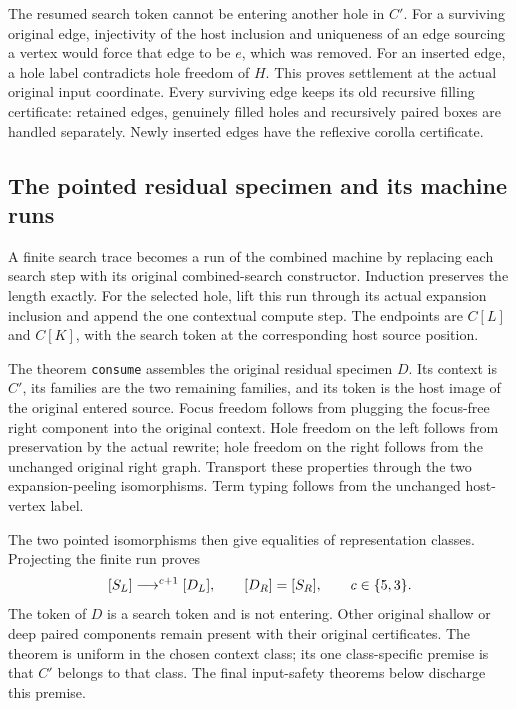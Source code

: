 
The resumed search token cannot be entering another hole in $C'$. For a
surviving original edge, injectivity of the host inclusion and uniqueness
of an edge sourcing a vertex would force that edge to be $e$, which was
removed. For an inserted edge, a hole label contradicts hole freedom of
$H$. This proves settlement at the actual original input coordinate.
Every surviving edge keeps its old recursive filling certificate: retained
edges, genuinely filled holes and recursively paired boxes are handled
separately. Newly inserted edges have the reflexive corolla certificate.


\subsection{The pointed residual specimen and its machine runs}
A finite search trace becomes a run of the combined machine by replacing
each search step with its original combined-search constructor. Induction
preserves the length exactly. For the selected hole, lift this run through
its actual expansion inclusion and append the one contextual compute step.
The endpoints are $C[L]$ and $C[K]$, with the search token at the
corresponding host source position.


The theorem \texttt{consume} assembles the original residual specimen $D$.
Its context is $C'$, its families are the two remaining families, and its
token is the host image of the original entered source. Focus freedom follows
from plugging the focus-free right component into the original context.
Hole freedom on the left follows from preservation by the actual rewrite;
hole freedom on the right follows from the unchanged original right graph.
Transport these properties through the two expansion-peeling isomorphisms.
Term typing follows from the unchanged host-vertex label.

The two pointed isomorphisms then give equalities of representation classes.
Projecting the finite run proves
\[
 [S_L]\mathrel{\longrightarrow^{c+1}}[D_L],\qquad [D_R]=[S_R],
 \qquad c\in\{5,3\}.
\]
The token of $D$ is a search token and is not entering. Other original
shallow or deep paired components remain present with their original
certificates. The theorem is uniform in the chosen context class; its one
class-specific premise is that $C'$ belongs to that class. The final
input-safety theorems below discharge this premise.

